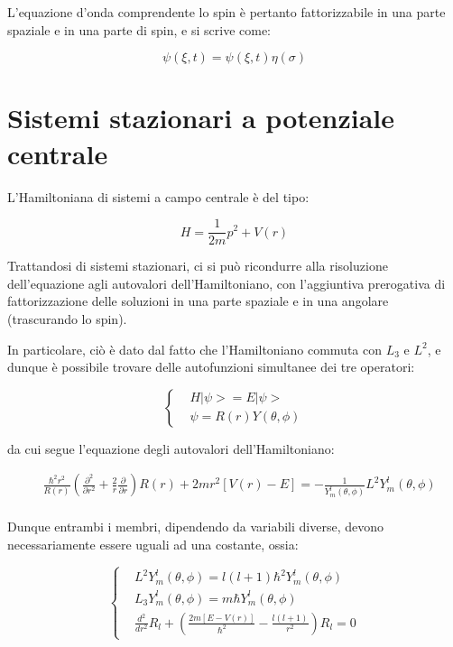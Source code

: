 \documentclass{article}
\begin{document}
L'equazione d'onda comprendente lo spin è pertanto fattorizzabile in una parte spaziale e in una parte di spin, e si scrive come:

\begin{equation}
    \psi(\xi, t)=\psi(\xi, t) \eta(\sigma)
\end{equation}


\section{Sistemi stazionari a potenziale centrale}
L'Hamiltoniana di sistemi a campo centrale è del tipo:

\begin{equation}
    H=\frac{1}{2m}p^2+V(r)
\end{equation}

Trattandosi di sistemi stazionari, ci si può ricondurre alla risoluzione dell'equazione agli autovalori dell'Hamiltoniano,
con l'aggiuntiva prerogativa di fattorizzazione delle soluzioni in una parte spaziale e in una angolare (trascurando lo spin).

In particolare, ciò è dato dal fatto che l'Hamiltoniano commuta con $L_3$ e $L^2$, e dunque è possibile trovare delle autofunzioni simultanee dei tre operatori:

\begin{equation}
    \left\{
    \begin{aligned}
         & H|\psi>=E|\psi>           \\
         & \psi= R(r)Y(\theta, \phi)
    \end{aligned}
    \right.
\end{equation}

da cui segue l'equazione degli autovalori dell'Hamiltoniano:

\begin{equation}
    \begin{aligned}
         & \frac{\hbar^2r^2}{R(r)}\left(\frac{\partial^2}{\partial r^2}+\frac{2}{r}\frac{\partial}{\partial r}  \right)R(r)+2mr^2[V(r)-E] =-\frac{1}{Y^l_m(\theta,\phi)}L^2Y^l_m(\theta,\phi) \\
    \end{aligned}
\end{equation}

Dunque entrambi i membri, dipendendo da variabili diverse, devono necessariamente essere uguali ad una costante,
ossia:

\begin{equation}
    \left\{
    \begin{aligned}
         & L^2Y^l_m(\theta,\phi)=l(l+1)\hbar^2Y^l_m(\theta,\phi)                                 \\
         & L_3Y^l_m(\theta,\phi)=m\hbar Y^l_m(\theta,\phi)                                       \\
         & \frac{d^2}{dr^2}R_l + \left(\frac{2m[E-V(r)]}{\hbar^2}-\frac{l(l+1)}{r^2}\right)R_l=0
    \end{aligned}
    \right.
\end{equation}
\end{document}
